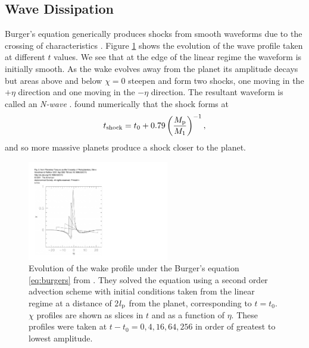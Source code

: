\subsection{Wave Dissipation}

Burger's equation generically produces shocks from smooth waveforms due to the crossing of characteristics \citep{whitham1999}.
Figure \ref{fig:wake_profiles_GR01} shows the evolution of the wave profile taken at different $t$ values.
We see that at the edge of the linear regime the waveform is initially smooth.
As the wake evolves away from the planet its amplitude decays but areas above and below $\chi=0$ steepen and form two shocks, one moving in the $+\eta$ direction and one moving in the $-\eta$ direction.
The resultant waveform is called an \textit{N-wave} \citep{landau1959}.
\citet{goodman2001} found numerically that the shock forms at 
\begin{align}
    t_{\rm shock} = t_0 + 0.79 \left( \frac{M_{\rm p}}{M_1} \right)^{-1},
\end{align}
and so more massive planets produce a shock closer to the planet.

\begin{figure}
    \centering
    \includegraphics[width = 0.55\textwidth]{figures/wake_profiles_GR01.pdf}
    \caption{Evolution of the wake profile under the Burger's equation \ref{eq:burgers} from \citet{goodman2001}.
    They solved the equation using a second order advection scheme with initial conditions taken from the linear regime at a distance of 2$l_{\rm p}$ from the planet, corresponding to $t=t_0$.
    $\chi$ profiles are shown as slices in $t$ and as a function of $\eta$.
    These profiles were taken at $t-t_0 = 0, 4, 16, 64, 256$ in order of greatest to lowest amplitude.}
    \label{fig:wake_profiles_GR01}
\end{figure}

